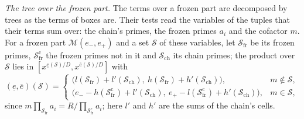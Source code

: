 \documentclass[11pt]{article}
\theoremstyle{definition}
\begin{document}
\emph{The tree over the frozen part.} The terms over a frozen part are decomposed by trees as the terms of boxes are.
Their tests read the variables of the tuples that their terms sum over: the chain's primes, the frozen primes $a_i$ and
the cofactor $m$. For a frozen part $\mathcal M(e_-, e_+)$ and a set $\mathcal S$ of these variables, let
$\mathcal S_{\mathrm{fr}}$ be its frozen primes, $\mathcal S_{\mathrm{fr}}^{\mathrm c}$ the frozen primes not in it and
$\mathcal S_{\mathrm{ch}}$ its chain primes; the product over $\mathcal S$ lies in $[x^{\underline e(\mathcal S)/D},
x^{\overline e(\mathcal S)/D}]$ with
\[
  (\underline e, \overline e)(\mathcal S) = \begin{cases}
    \bigl(l(\mathcal S_{\mathrm{fr}}) + l'(\mathcal S_{\mathrm{ch}}),\
    h(\mathcal S_{\mathrm{fr}}) + h'(\mathcal S_{\mathrm{ch}})\bigr), & m \notin \mathcal S, \\
    \bigl(e_- - h(\mathcal S_{\mathrm{fr}}^{\mathrm c}) + l'(\mathcal S_{\mathrm{ch}}),\
    e_+ - l(\mathcal S_{\mathrm{fr}}^{\mathrm c}) + h'(\mathcal S_{\mathrm{ch}})\bigr), & m \in \mathcal S,
  \end{cases}
\]
since $m \prod_{\mathcal S_{\mathrm{fr}}} a_i = R/\prod_{\mathcal S_{\mathrm{fr}}^{\mathrm c}} a_i$; here $l'$ and
$h'$ are the sums of the chain's cells.
\end{document}
